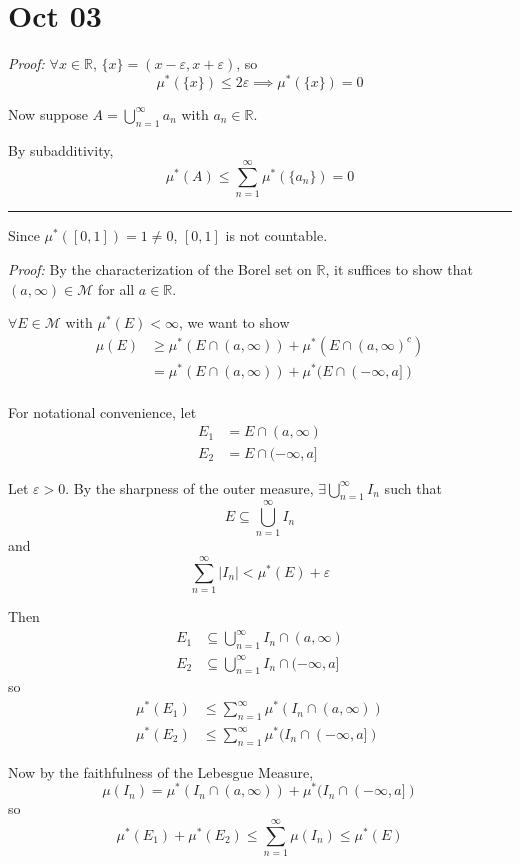 \documentclass[12pt]{report}
\newcommand{\R}{\mathbb{R}}
\newcommand{\abs}[1]{\left\vert #1 \right\vert}
\newcommand{\ep}{\varepsilon}
\newcommand{\B}{\mathcal{B}}
\newcommand{\M}{\mathcal{M}}
\newcommand{\sub}{\subseteq}
\renewcommand{\div}{\vspace*{10pt}\hrule\vspace*{10pt}}
\newenvironment*{tbox}[2][gray]{
    \begin{tcolorbox}[
        parbox=false,
        colback=#1!5!white,
        colframe=#1!75!black,
        breakable,
        title={#2}
    ]}
    {\end{tcolorbox}}
\begin{document}
\section*{Oct 03}
    \begin{tbox}{\textbf{Corollary:} If $A$ is a countable subset of $\R$, $\mu^*(A) = 0$. Furthermore, $[0, 1]$ is not countable. }
        \emph{Proof:} $\forall x \in \R$, $\{x\} = (x - \ep, x + \ep)$, so 
        \[\mu^*(\{x\}) \leq 2\ep \implies \mu^*(\{x\})= 0\]

        Now suppose $A = \bigcup_{n=1}^\infty a_n$ with $a_n \in \R$. 

        By subadditivity, 
        \[\mu^*(A) \leq \sum_{n=1}^{\infty} \mu^*(\{a_n\}) = 0\]
        
        \div 

        Since $\mu^*([0, 1]) = 1 \neq 0$, $[0, 1]$ is not countable.
    \end{tbox}

    \begin{tbox}{\textbf{Proposition:} $\B_{\R} \sub \M$}
        \emph{Proof:} By the characterization of the Borel set on $\R$, it suffices to show that $(a, \infty) \in \M$ for all $a \in \R$. 

        $\forall E \in \M$ with $\mu^*(E) < \infty$, we want to show 
        \begin{align*}
            \mu(E) &\geq \mu^*(E \cap (a, \infty)) + \mu^*(E \cap (a, \infty)^c)\\ 
            &= \mu^*(E \cap (a, \infty)) + \mu^*(E \cap (-\infty, a])\\
        \end{align*}

        For notational convenience, let 
        \begin{align*}
            E_1 &= E \cap (a, \infty)\\ 
            E_2 &= E \cap (-\infty, a]
        \end{align*}

        Let $\ep > 0$. By the sharpness of the outer measure, $\exists \bigcup_{n=1}^\infty I_n$ such that  
        \[E \sub \bigcup_{n=1}^\infty I_n\]
        and 
        \[\sum_{n=1}^{\infty} \abs{I_n} < \mu^*(E) + \ep\]

        Then 
        \begin{align*}
            E_1 &\sub \bigcup_{n=1}^\infty I_n \cap (a, \infty)\\ 
            E_2 &\sub \bigcup_{n=1}^\infty I_n \cap (-\infty, a]
        \end{align*}
        so 
        \begin{align*}
            \mu^*(E_1) &\leq \sum_{n=1}^{\infty} \mu^*(I_n \cap (a, \infty))\\ 
            \mu^*(E_2) &\leq \sum_{n=1}^{\infty} \mu^*(I_n \cap (-\infty, a])
        \end{align*}

        Now by the faithfulness of the Lebesgue Measure,
        \[\mu(I_n) = \mu^*(I_n \cap (a, \infty)) +  \mu^*(I_n \cap (-\infty, a])\]
        so 
        \[\mu^*(E_1) + \mu^*(E_2) \leq \sum_{n=1}^{\infty} \mu(I_n) \leq \mu^*(E)\]
    \end{tbox}
\end{document}
